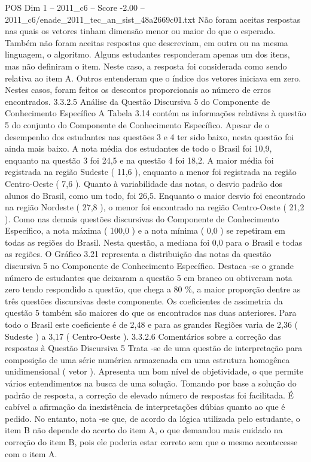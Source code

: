 \begin{textsample}{POS Dim 1 – 2011\_c6 – Score -2.00 – 2011\_c6/enade\_2011\_tec\_an\_sist\_48a2669c01.txt}
Não foram aceitas respostas nas quais os vetores tinham dimensão menor ou maior do que o esperado.
Também não foram aceitas respostas que descreviam, em outra ou na mesma linguagem, o algoritmo.
Alguns estudantes responderam apenas um dos itens, mas não definiram o item.
Neste caso, a resposta foi considerada como sendo relativa ao item A.
Outros entenderam que o índice dos vetores iniciava em zero.
Nestes casos, foram feitos os descontos proporcionais ao número de erros encontrados. 3.3.2.5 Análise da Questão Discursiva 5 do Componente de Conhecimento Específico A Tabela 3.14 contém as informações relativas à questão 5 do conjunto do Componente de Conhecimento Específico.
Apesar de o desempenho dos estudantes nas questões 3 e 4 ter sido baixo, nesta questão foi ainda mais baixo.
A nota média dos estudantes de todo o Brasil foi 10,9, enquanto na questão 3 foi 24,5 e na questão 4 foi 18,2.
A maior média foi registrada na região Sudeste ( 11,6 ), enquanto a menor foi registrada na região Centro-Oeste ( 7,6 ).
Quanto à variabilidade das notas, o desvio padrão dos alunos do Brasil, como um todo, foi 26,5.
Enquanto o maior desvio foi encontrado na região Nordeste ( 27,8 ), o menor foi encontrado na região Centro-Oeste ( 21,2 ).
Como nas demais questões discursivas do Componente de Conhecimento Específico, a nota máxima ( 100,0 ) e a nota mínima ( 0,0 ) se repetiram em todas as regiões do Brasil.
Nesta questão, a mediana foi 0,0 para o Brasil e todas as regiões.
O Gráfico 3.21 representa a distribuição das notas da questão discursiva 5 no Componente de Conhecimento Específico.
Destaca -se o grande número de estudantes que deixaram a questão 5 em branco ou obtiveram nota zero tendo respondido a questão, que chega a 80 \%, a maior proporção dentre as três questões discursivas deste componente.
Os coeficientes de assimetria da questão 5 também são maiores do que os encontrados nas duas anteriores.
Para todo o Brasil este coeficiente é de 2,48 e para as grandes Regiões varia de 2,36 ( Sudeste ) a 3,17 ( Centro-Oeste ). 3.3.2.6 Comentários sobre a correção das respostas à Questão Discursiva 5 Trata -se de uma questão de interpretação para composição de uma série numérica armazenada em uma estrutura homogênea unidimensional ( vetor ).
Apresenta um bom nível de objetividade, o que permite vários entendimentos na busca de uma solução.
Tomando por base a solução do padrão de resposta, a correção de elevado número de respostas foi facilitada.
É cabível a afirmação da inexistência de interpretações dúbias quanto ao que é pedido.
No entanto, nota -se que, de acordo da lógica utilizada pelo estudante, o item B não depende do acerto do item A, o que demandou mais cuidado na correção do item B, pois ele poderia estar correto sem que o mesmo acontecesse com o item A.

\end{textsample}
